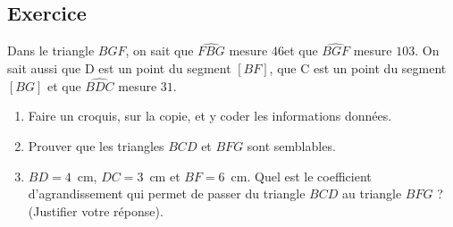 \documentclass[a4paper,12pt,fleqn]{article}
\newcounter{exo}          				%
\newcommand{\exo}{					%
  	\stepcounter{exo}        			%
  	\subsection*{Exercice \no{}\theexo}}
\begin{document}
\vspace{0.5cm}

\medskip
\begin{minipage}{0.99\linewidth}

\exo

Dans le triangle $BGF$, on sait que $\widehat{FBG}$ mesure $46$\degre et que $\widehat{BGF}$ mesure $103$\degre. On sait aussi que D est un point du segment $[BF]$, que C est un point du segment $[BG]$ et que $\widehat{BDC}$ mesure $31$\degre.

		\begin{enumerate}
		\item Faire un croquis, sur la copie, et y coder les informations données.
		\item Prouver que les triangles $BCD$ et $BFG$ sont semblables.
		\item $BD= 4$~cm, $DC=3$~cm et $BF=6$~cm. Quel est le coefficient d'agrandissement qui permet de passer du triangle $BCD$ au triangle $BFG$ ? (Justifier votre réponse).
		\end{enumerate}	

\end{minipage}

\vspace{0.5cm}
\medskip
\newpage
\end{document}
